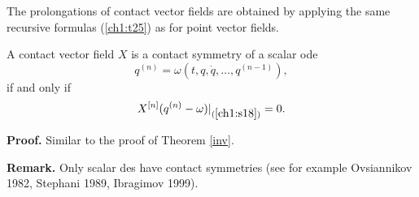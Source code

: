 The prolongations of contact vector fields are obtained by applying the same
recursive formulas (\ref{ch1:t25}) as for point vector fields.
\begin{theo}
\begin{em}
A contact vector field $X$ is a contact symmetry of a scalar ode
\begin{equation}
\label{ch1:s18}
 q^{(n)}=\omega (t,q,\dot q,\ldots,q^{(n-1)}),
\end{equation}
if and only if
\begin{equation}
\label{ch1:s19}
X^{[n]}(q^{(n)}-\omega)|_{(\ref{ch1:s18})}=0.
\end{equation}
\end{em}
\end{theo}
{\bf Proof.} Similar to the proof of Theorem \ref{inv}.

{\bf Remark.} Only scalar des have contact symmetries (see for example
Ovsiannikov 1982, Stephani 1989, Ibragimov 1999).
